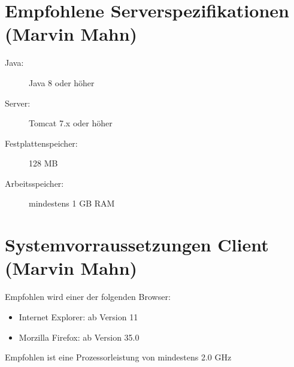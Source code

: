 \documentclass[a4paper,12pt]{scrreprt}
\begin{document}
	\section{Empfohlene Serverspezifikationen (Marvin Mahn)}
	\begin{description}
		\item[Java:] Java 8 oder h\"oher
		\item[Server:] Tomcat 7.x oder h\"oher
		\item[Festplattenspeicher:] 128 MB
		\item[Arbeitsspeicher:] mindestens 1 GB RAM
	\end{description}
	\section{Systemvorraussetzungen Client (Marvin Mahn)}
	Empfohlen wird einer der folgenden Browser:
	\begin{itemize}
		\item Internet Explorer: ab Version 11
		\item Morzilla Firefox: ab Version 35.0
	\end{itemize}
	Empfohlen ist eine Prozessorleistung von mindestens 2.0 GHz
\end{document}

